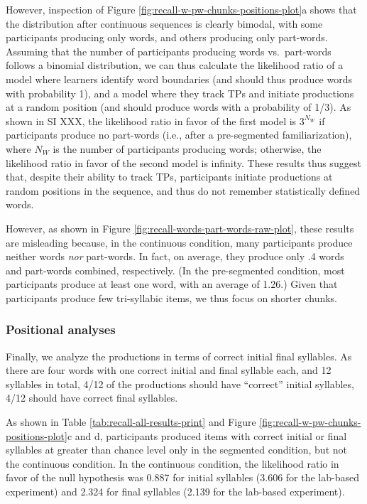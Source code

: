 \documentclass[
]{article}
\begin{document}
However, inspection of Figure
\ref{fig:recall-w-pw-chunks-positions-plot}a shows that the distribution
after continuous sequences is clearly bimodal, with some participants
producing only words, and others producing only part-words. Assuming
that the number of participants producing words vs.~part-words follows a
binomial distribution, we can thus calculate the likelihood ratio of a
model where learners identify word boundaries (and should thus produce
words with probability 1), and a model where they track TPs and initiate
productions at a random position (and should produce words with a
probability of 1/3). As shown in SI XXX, the likelihood ratio in favor
of the first model is \(3^{N_W}\) if participants produce no part-words
(i.e., after a pre-segmented familiarization), where \(N_W\) is the
number of participants producing words; otherwise, the likelihood ratio
in favor of the second model is infinity. These results thus suggest
that, despite their ability to track TPs, participants initiate
productions at random positions in the sequence, and thus do not
remember statistically defined words.

However, as shown in Figure \ref{fig:recall-words-part-words-raw-plot},
these results are misleading because, in the continuous condition, many
participants produce neither words \emph{nor} part-words. In fact, on
average, they produce only .4 words and part-words combined,
respectively. (In the pre-segmented condition, most participants produce
at least one word, with an average of 1.26.) Given that participants
produce few tri-syllabic items, we thus focus on shorter chunks.

\subsubsection{Positional analyses}\label{positional-analyses}

Finally, we analyze the productions in terms of correct initial final
syllables. As there are four words with one correct initial and final
syllable each, and 12 syllables in total, 4/12 of the productions should
have ``correct'' initial syllables, 4/12 should have correct final
syllables.

As shown in Table \ref{tab:recall-all-results-print} and Figure
\ref{fig:recall-w-pw-chunks-positions-plot}c and d, participants
produced items with correct initial or final syllables at greater than
chance level only in the segmented condition, but not the continuous
condition. In the continuous condition, the likelihood ratio in favor of
the null hypothesis was 0.887 for initial syllables (3.606 for the
lab-based experiment) and 2.324 for final syllables (2.139 for the
lab-based experiment).
\end{document}

